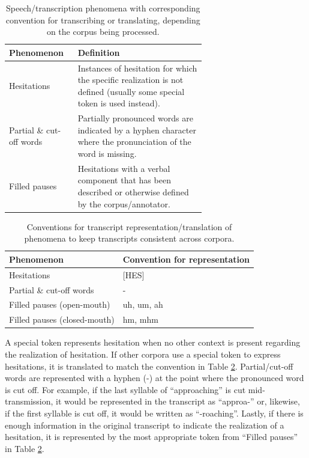 \documentclass[12pt]{article}
\begin{document}
\begin{table}[!t]
    \centering
    \begin{tabular}{l p{0.65\linewidth}}
        \toprule
        Phenomenon               & Definition                                                                                                              \\
        \midrule
        Hesitations              & Instances of hesitation for which the specific realization is not defined (usually some special token is used instead). \\
        \midrule
        Partial \& cut-off words & Partially pronounced words are indicated by a hyphen character where the pronunciation of the word is missing.          \\
        \midrule
        Filled pauses            & Hesitations with a verbal component that has been described or otherwise defined by the corpus/annotator.               \\
        \bottomrule
    \end{tabular}
    \caption{Speech/transcription phenomena with corresponding convention for transcribing or translating, depending on the corpus being processed.}
    \label{tab:phenomena_definitions}
\end{table}


\begin{table}[!t]
    \centering
    \begin{tabular}{l l}
        \toprule
        Phenomenon                   & Convention for representation \\
        \midrule
        Hesitations                  & [HES]                         \\
        \midrule
        Partial \& cut-off words     & -                             \\
        \midrule
        Filled pauses (open-mouth)   & uh, um, ah                    \\
        \midrule
        Filled pauses (closed-mouth) & hm, mhm                       \\
        \bottomrule
    \end{tabular}
    \caption{Conventions for transcript representation/translation of phenomena to keep transcripts consistent across corpora.}
    \label{tab:phenomena_conventions}
\end{table}

A special token represents hesitation when no other context is present regarding the realization of hesitation. If other corpora use a special token
to express hesitations, it is translated to match the convention in Table \ref{tab:phenomena_conventions}. Partial/cut-off words are represented with
a hyphen (-) at the point where the pronounced word is cut off. For example, if the last syllable of ``approaching'' is cut mid-transmission, it would
be represented in the transcript as ``approa-'' or, likewise, if the first syllable is cut off, it would be written as ``-roaching''. Lastly, if there
is enough information in the original transcript to indicate the realization of a hesitation, it is represented by the most appropriate token from
``Filled pauses'' in Table \ref{tab:phenomena_conventions}.
\end{document}
